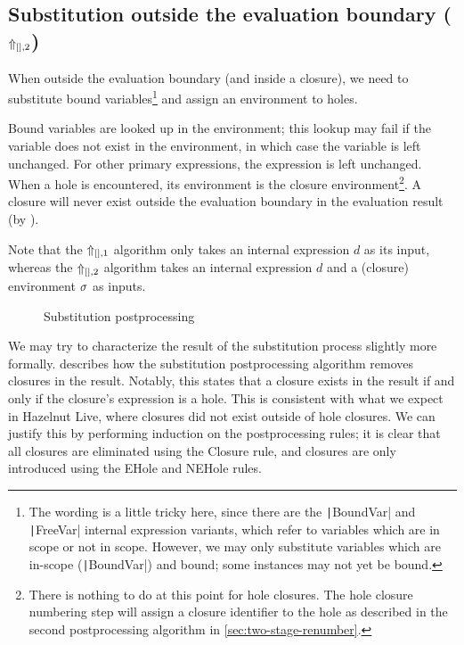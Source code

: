 \subsection{Substitution outside the evaluation boundary ($\Uparrow_{[],2}$)}
\label{sec:postprocessing-subst-outside}

When outside the evaluation boundary (and inside a closure), we need to substitute bound variables\footnote{The wording is a little tricky here, since there are the \texttt|BoundVar| and \texttt|FreeVar| internal expression variants, which refer to variables which are in scope or not in scope. However, we may only substitute variables which are in-scope (\texttt|BoundVar|) and bound; some instances may not yet be bound.} and assign an environment to holes.

Bound variables are looked up in the environment; this lookup may fail if the variable does not exist in the environment, in which case the variable is left unchanged. For other primary expressions, the expression is left unchanged. When a hole is encountered, its environment is the closure environment\footnote{There is nothing to do at this point for hole closures. The hole closure numbering step will assign a closure identifier to the hole as described in the second postprocessing algorithm in \cref{sec:two-stage-renumber}.}. A closure will never exist outside the evaluation boundary in the evaluation result (by ).

Note that the $\Uparrow_{[],1}$ algorithm only takes an internal expression $d$ as its input, whereas the $\Uparrow_{[],2}$ algorithm takes an internal expression $d$ and a (closure) environment $\sigma$ as inputs.


\begin{figure}
  \centering
  \begin{mdframed}
    \begin{singlespace}
      
    \end{singlespace}
  \end{mdframed}
  \caption{Substitution postprocessing}
  \label{fig:big-step-inside-formal}
\end{figure}

We may try to characterize the result of the substitution process slightly more formally.  describes how the substitution postprocessing algorithm removes closures in the result. Notably, this states that a closure exists in the result if and only if the closure's expression is a hole. This is consistent with what we expect in Hazelnut Live, where closures did not exist outside of hole closures. We can justify this by performing induction on the postprocessing rules; it is clear that all closures are eliminated using the \pplcl{}Closure rule, and closures are only introduced using the \pplclo{}EHole and \pplclo{}NEHole rules.

